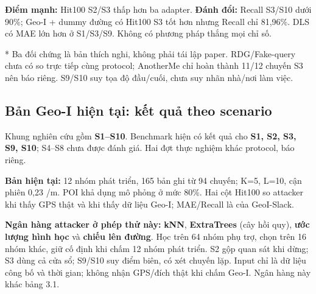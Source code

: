\textbf{Điểm mạnh:} Hit100 S2/S3 thấp hơn ba adapter. \textbf{Đánh đổi:} Recall S3/S10 dưới 90\%; Geo-I + dummy đường có Hit100 S3 tốt hơn nhưng Recall chỉ 81,96\%. DLS có MAE lớn hơn ở S1/S3/S9. Không có phương pháp thắng mọi chỉ số.

* Ba đối chứng là bản thích nghi, không phải tái lập paper. RDG/Fake-query chưa có so trực tiếp cùng protocol; AnotherMe chỉ hoàn thành 11/12 chuyến S3 nên báo riêng. S9/S10 suy tọa độ đầu/cuối, chưa suy nhãn nhà/nơi làm việc.


\clearpage
\subsection{Bản Geo-I hiện tại: kết quả theo scenario}
Khung nghiên cứu gồm \textbf{S1–S10}. Benchmark hiện có kết quả cho \textbf{S1, S2, S3, S9, S10}; S4–S8 chưa được đánh giá. Hai đợt thực nghiệm khác protocol, báo riêng.

\textbf{Bản hiện tại:} 12 nhóm phát triển, 165 bản ghi từ 94 chuyến; K=5, L=10, cận phiên 0,23 /m. POI khả dụng mô phỏng ở mức 80\%. Hai cột Hit100 so attacker khi thấy GPS thật và khi thấy dữ liệu Geo-I; MAE/Recall là của GeoI-Slack.

\textbf{Ngân hàng attacker ở phép thử này:} \textbf{kNN}, \textbf{ExtraTrees} (cây hồi quy), \textbf{ước lượng hình học} và \textbf{chiếu lên đường}. Học trên 64 nhóm phụ trợ, chọn trên 16 nhóm khác, giữ cố định khi chấm 12 nhóm phát triển. S2 gộp quan sát khi dừng; S3 dùng cả cửa sổ; S9/S10 suy điểm biên, có xét chuyến lặp. Input chỉ là dữ liệu công bố và thời gian; không nhận GPS/đích thật khi chấm Geo-I. Ngân hàng này khác bảng 3.1.


